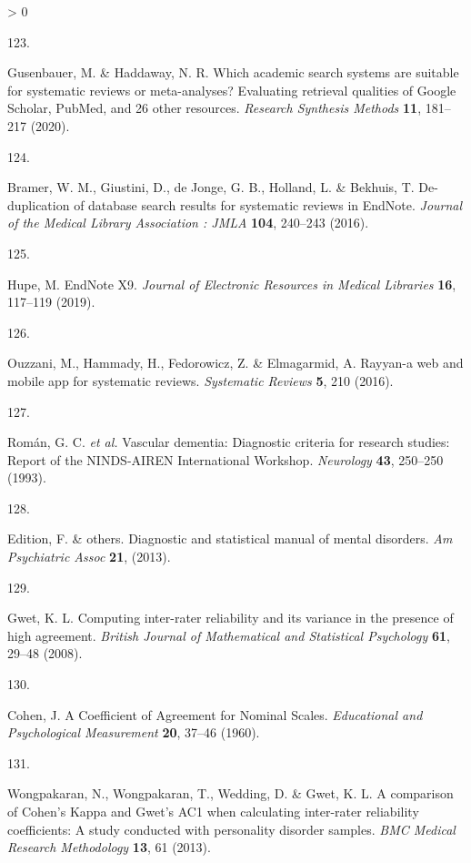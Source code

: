 \documentclass[a4paper, twoside]{templates/ociamthesis}
\newlength{\cslhangindent}
\newlength{\csllabelwidth}
\newenvironment{CSLReferences}[3] %
 {%
  \setlength{\parindent}{0pt}
  \ifodd #1 \everypar{\setlength{\hangindent}{\cslhangindent}}\ignorespaces\fi
  \ifnum #2 > 0
  \setlength{\parskip}{#2\baselineskip}
  \fi
 }%
 {}
\newcommand{\CSLLeftMargin}[1]{\parbox[t]{\maxof{\widthof{#1}}{\csllabelwidth}}{#1}}
\newcommand{\CSLRightInline}[1]{\parbox[t]{\linewidth - \csllabelwidth}{#1}}
\begin{document}
\begin{CSLReferences}{0}{0}
\leavevmode\hypertarget{ref-gusenbauer2020a}{}%
\CSLLeftMargin{123. }
\CSLRightInline{Gusenbauer, M. \& Haddaway, N. R. Which academic search systems are suitable for systematic reviews or meta-analyses? {Evaluating} retrieval qualities of {Google Scholar}, {PubMed}, and 26 other resources. \emph{Research Synthesis Methods} \textbf{11}, 181--217 (2020).}

\leavevmode\hypertarget{ref-bramer2016}{}%
\CSLLeftMargin{124. }
\CSLRightInline{Bramer, W. M., Giustini, D., de Jonge, G. B., Holland, L. \& Bekhuis, T. De-duplication of database search results for systematic reviews in {EndNote}. \emph{Journal of the Medical Library Association : JMLA} \textbf{104}, 240--243 (2016).}

\leavevmode\hypertarget{ref-hupe2019}{}%
\CSLLeftMargin{125. }
\CSLRightInline{Hupe, M. {EndNote X9}. \emph{Journal of Electronic Resources in Medical Libraries} \textbf{16}, 117--119 (2019).}

\leavevmode\hypertarget{ref-ouzzani2016}{}%
\CSLLeftMargin{126. }
\CSLRightInline{Ouzzani, M., Hammady, H., Fedorowicz, Z. \& Elmagarmid, A. Rayyan-a web and mobile app for systematic reviews. \emph{Systematic Reviews} \textbf{5}, 210 (2016).}

\leavevmode\hypertarget{ref-roman1993}{}%
\CSLLeftMargin{127. }
\CSLRightInline{Román, G. C. \emph{et al.} Vascular dementia: Diagnostic criteria for research studies: Report of the {NINDS}-{AIREN International Workshop}. \emph{Neurology} \textbf{43}, 250--250 (1993).}

\leavevmode\hypertarget{ref-edition2013}{}%
\CSLLeftMargin{128. }
\CSLRightInline{Edition, F. \& others. Diagnostic and statistical manual of mental disorders. \emph{Am Psychiatric Assoc} \textbf{21}, (2013).}

\leavevmode\hypertarget{ref-gwet2008}{}%
\CSLLeftMargin{129. }
\CSLRightInline{Gwet, K. L. Computing inter-rater reliability and its variance in the presence of high agreement. \emph{British Journal of Mathematical and Statistical Psychology} \textbf{61}, 29--48 (2008).}

\leavevmode\hypertarget{ref-cohen1960}{}%
\CSLLeftMargin{130. }
\CSLRightInline{Cohen, J. A {Coefficient} of {Agreement} for {Nominal Scales}. \emph{Educational and Psychological Measurement} \textbf{20}, 37--46 (1960).}

\leavevmode\hypertarget{ref-wongpakaran2013}{}%
\CSLLeftMargin{131. }
\CSLRightInline{Wongpakaran, N., Wongpakaran, T., Wedding, D. \& Gwet, K. L. A comparison of {Cohen}'s {Kappa} and {Gwet}'s {AC1} when calculating inter-rater reliability coefficients: A study conducted with personality disorder samples. \emph{BMC Medical Research Methodology} \textbf{13}, 61 (2013).}


\end{CSLReferences}
\end{document}
